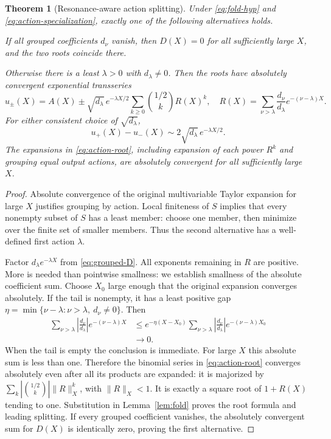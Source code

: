 \documentclass[11pt,a4paper]{article}
\newtheorem{theorem}{Theorem}[section]
\theoremstyle{definition}
\theoremstyle{remark}
\begin{document}
\begin{theorem}[Resonance-aware action splitting]\label{thm:actions}
Under \eqref{eq:fold-hyp} and \eqref{eq:action-specialization}, exactly one
of the following alternatives holds.

If all grouped coefficients $d_\nu$ vanish, then $D(X)=0$ for all
sufficiently large $X$, and the two roots coincide there.

Otherwise there is a least $\lambda>0$ with $d_\lambda\ne0$. Then the
roots have absolutely convergent exponential transseries
\begin{equation}\label{eq:action-root}
 u_\pm(X)=A(X)\pm\sqrt{d_\lambda}\,e^{-\lambda X/2}
       \sum_{k\ge0}\binom{1/2}{k}R(X)^k,
 \quad
 R(X)=\sum_{\nu>\lambda}\frac{d_\nu}{d_\lambda}
                              e^{-(\nu-\lambda)X}.
\end{equation}
For either consistent choice of $\sqrt{d_\lambda}$,
\begin{equation}\label{eq:splitting}
 u_+(X)-u_-(X)\sim2\sqrt{d_\lambda}\,e^{-\lambda X/2}.
\end{equation}
The expansions in \eqref{eq:action-root}, including expansion of each
power $R^k$ and grouping equal output actions, are absolutely convergent
for all sufficiently large $X$.
\end{theorem}
\begin{proof}
Absolute convergence of the original multivariable Taylor expansion for
large $X$ justifies grouping by action. Local finiteness of $S$ implies
that every nonempty subset of $S$ has a least member: choose one member,
then minimize over the finite set of smaller members. Thus the second
alternative has a well-defined first action $\lambda$.

Factor $d_\lambda e^{-\lambda X}$ from \eqref{eq:grouped-D}. All exponents
remaining in $R$ are positive. More is needed than pointwise smallness:
we establish smallness of the absolute coefficient sum. Choose $X_0$
large enough that the original expansion converges absolutely. If the
tail is nonempty, it has a least positive gap
$\eta=\min\{\nu-\lambda:\nu>\lambda,\ d_\nu\ne0\}$.
Then
\begin{align*}
 \sum_{\nu>\lambda}\left|\frac{d_\nu}{d_\lambda}\right|
                       e^{-(\nu-\lambda)X}
 &\le e^{-\eta(X-X_0)}
       \sum_{\nu>\lambda}\left|\frac{d_\nu}{d_\lambda}\right|
                       e^{-(\nu-\lambda)X_0}\\
 &\longrightarrow0.
\end{align*}
When the tail is empty the conclusion is immediate.
For large $X$ this absolute sum is less than one. Therefore the binomial
series in \eqref{eq:action-root} converges absolutely even after all its
products are expanded: it is majorized by
$\sum_k|\binom{1/2}{k}|\|R\|_X^k$, with $\|R\|_X<1$.
It is exactly a square root of $1+R(X)$ tending to one. Substitution in
Lemma~\ref{lem:fold} proves the root formula and leading splitting.
If every grouped coefficient vanishes, the absolutely convergent sum
for $D(X)$ is identically zero, proving the first alternative.
\end{proof}
\end{document}

